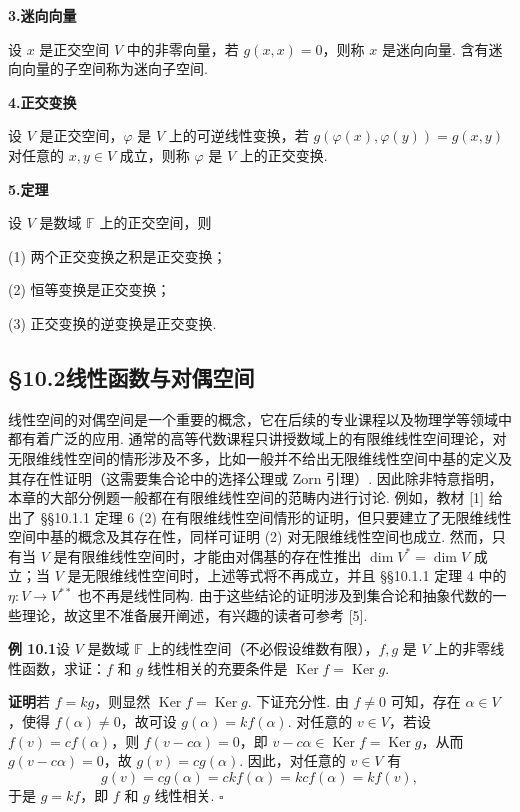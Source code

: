 \documentclass[UTF8, 12pt, fontset=fandol, oneside]{ctexart}
\begin{document}
\noindent\textbf{3.\quad 迷向向量}

设 $x$ 是正交空间 $V$ 中的非零向量，若 $g(x,x)=0$，则称 $x$ 是迷向向量. 含有迷向向量的子空间称为迷向子空间.

\noindent\textbf{4.\quad 正交变换}

设 $V$ 是正交空间，$\varphi$ 是 $V$ 上的可逆线性变换，若 $g(\varphi(x),\varphi(y))=g(x,y)$ 对任意的 $x,y\in V$ 成立，则称 $\varphi$ 是 $V$ 上的正交变换.

\noindent\textbf{5.\quad 定理}

设 $V$ 是数域 $\mathbb{F}$ 上的正交空间，则

(1) 两个正交变换之积是正交变换；

(2) 恒等变换是正交变换；

(3) 正交变换的逆变换是正交变换.

\subsection*{§10.2\quad 线性函数与对偶空间}

线性空间的对偶空间是一个重要的概念，它在后续的专业课程以及物理学等领域中都有着广泛的应用. 通常的高等代数课程只讲授数域上的有限维线性空间理论，对无限维线性空间的情形涉及不多，比如一般并不给出无限维线性空间中基的定义及其存在性证明（这需要集合论中的选择公理或 Zorn 引理）. 因此除非特意指明，本章的大部分例题一般都在有限维线性空间的范畴内进行讨论. 例如，教材 [1] 给出了 §§10.1.1 定理 6 (2) 在有限维线性空间情形的证明，但只要建立了无限维线性空间中基的概念及其存在性，同样可证明 (2) 对无限维线性空间也成立. 然而，只有当 $V$ 是有限维线性空间时，才能由对偶基的存在性推出 $\dim V^*=\dim V$ 成立；当 $V$ 是无限维线性空间时，上述等式将不再成立，并且 §§10.1.1 定理 4 中的 $\eta:V\to V^{**}$ 也不再是线性同构. 由于这些结论的证明涉及到集合论和抽象代数的一些理论，故这里不准备展开阐述，有兴趣的读者可参考 [5].

\noindent\textbf{例 10.1}\quad 设 $V$ 是数域 $\mathbb{F}$ 上的线性空间（不必假设维数有限），$f,g$ 是 $V$ 上的非零线性函数，求证：$f$ 和 $g$ 线性相关的充要条件是 $\operatorname{Ker}f=\operatorname{Ker}g$.

\noindent\textbf{证明}\quad 若 $f=kg$，则显然 $\operatorname{Ker}f=\operatorname{Ker}g$. 下证充分性. 由 $f\ne0$ 可知，存在 $\alpha\in V$，使得 $f(\alpha)\ne0$，故可设 $g(\alpha)=kf(\alpha)$. 对任意的 $v\in V$，若设 $f(v)=cf(\alpha)$，则 $f(v-c\alpha)=0$，即 $v-c\alpha\in\operatorname{Ker}f=\operatorname{Ker}g$，从而 $g(v-c\alpha)=0$，故 $g(v)=cg(\alpha)$. 因此，对任意的 $v\in V$ 有
\[
g(v)=cg(\alpha)=ckf(\alpha)=kcf(\alpha)=kf(v),
\]
于是 $g=kf$，即 $f$ 和 $g$ 线性相关. $\square$
\end{document}
